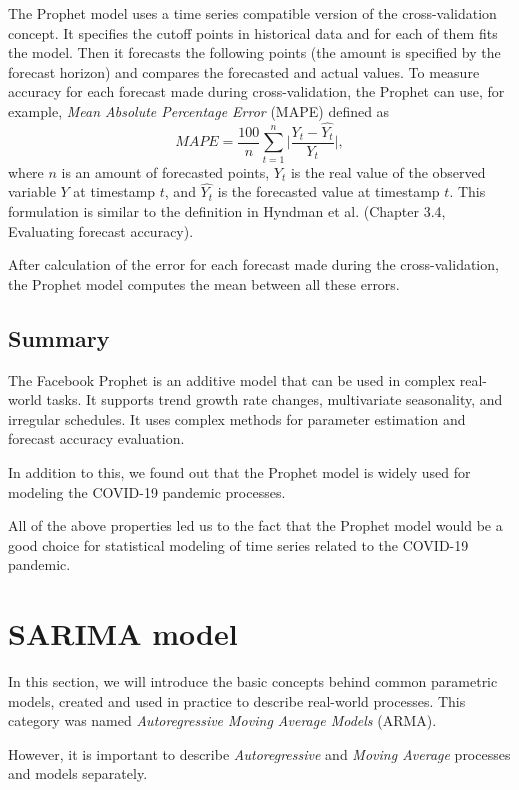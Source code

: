 The Prophet model uses a time series compatible version of the cross-validation concept. It specifies the cutoff points in historical data and for each of them fits the model. Then it forecasts the following points (the amount is specified by the forecast horizon) and compares the forecasted and actual values. To measure accuracy for each forecast made during cross-validation, the Prophet can use, for example, \textit{Mean Absolute Percentage Error} (MAPE) defined as 
\begin{equation}
    MAPE = \frac{100}{n} \sum_{t=1}^{n}\Big|\frac{Y_t - \hat{Y_t}}{Y_t}\Big|,
\end{equation}
where $n$ is an amount of forecasted points, $Y_t$ is the real value of the observed variable $Y$ at timestamp $t$, and $\hat{Y_t}$ is the forecasted value at timestamp $t$. This formulation is similar to the definition in Hyndman et al. \cite{Hyndman2018} (Chapter 3.4, Evaluating forecast accuracy).

After calculation of the error for each forecast made during the cross-validation, the Prophet model computes the mean between all these errors.

\subsection{Summary}

The Facebook Prophet is an additive model that can be used in complex real-world tasks. It supports trend growth rate changes, multivariate seasonality, and irregular schedules. It uses complex methods for parameter estimation and forecast accuracy evaluation. 

In addition to this, we found out that the Prophet model is widely used for modeling the COVID-19 pandemic processes. 

All of the above properties led us to the fact that the Prophet model would be a good choice for statistical modeling of time series related to the COVID-19 pandemic.

\section{SARIMA model}

In this section, we will introduce the basic concepts behind common parametric models, created and used in practice to describe real-world processes. This category was named \textit{Autoregressive Moving Average Models} (ARMA).

However, it is important to describe \textit{Autoregressive} and \textit{Moving Average} processes and models separately.

